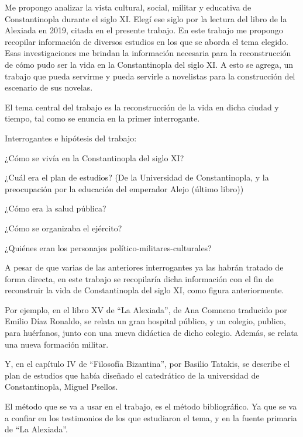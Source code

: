 


Me propongo analizar la vista cultural, social, militar y educativa de
Constantinopla durante el siglo XI. Elegí ese siglo por
la lectura del libro de la Alexiada en 2019, citada en el
presente trabajo.
En este trabajo me propongo recopilar información de diversos
estudios en los que se aborda el tema elegido.
Esas investigaciones me brindan la información necesaria para la
reconstrucción de cómo pudo ser la vida en la Constantinopla
del siglo XI. A esto se agrega, un trabajo que pueda servirme
y pueda servirle a novelistas para la construcción del escenario
de sus novelas.

El tema central del trabajo es la reconstrucción de la vida
en dicha ciudad y tiempo, tal como se enuncia en la primer
interrogante.

Interrogantes e hipótesis del trabajo:

¿Cómo se vivía en la Constantinopla del siglo XI?

¿Cuál era el plan de estudios?
(De la Universidad de Constantinopla, y la preocupación
por la educación del emperador Alejo (último libro))

¿Cómo era la salud pública?

¿Cómo se organizaba el ejército?

¿Quiénes eran los personajes político-militares-culturales?

A pesar de que varias de las anteriores interrogantes ya las habrán 
tratado de forma directa, en este trabajo se recopilaría dicha 
información con el fin de reconstruir la vida de Constantinopla del 
siglo XI, como figura anteriormente.

Por ejemplo, en el libro XV de “La Alexiada”, 
de Ana Comneno traducido por Emilio Díaz
Ronaldo, se relata un gran hospital 
público, y un colegio, publico, para huérfanos, junto con una nueva 
didáctica de dicho colegio. Además, se relata una nueva formación militar.

Y, en el capítulo IV de “Filosofía Bizantina”, 
por Basilio Tatakis, se describe el plan de 
estudios que había diseñado el catedrático de la universidad de 
Constantinopla, Miguel Psellos.

El método que se va a usar en el trabajo, es el método bibliográfico. 
Ya que se va a confiar en los testimonios de los que estudiaron el 
tema, y en la fuente primaria de “La Alexiada”.


